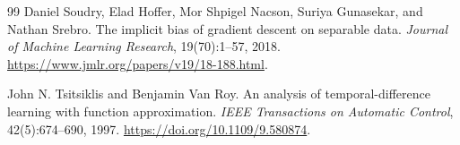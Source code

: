 \documentclass[11pt,twoside]{article}
\theoremstyle{definition}
\theoremstyle{remark}
\begin{document}
\begin{thebibliography}{99}
Daniel Soudry, Elad Hoffer, Mor Shpigel Nacson, Suriya Gunasekar, and
Nathan Srebro.
\newblock The implicit bias of gradient descent on separable data.
\newblock \emph{Journal of Machine Learning Research}, 19(70):1--57, 2018.
\newblock \url{https://www.jmlr.org/papers/v19/18-188.html}.

John N. Tsitsiklis and Benjamin Van Roy.
\newblock An analysis of temporal-difference learning with function
approximation.
\newblock \emph{IEEE Transactions on Automatic Control}, 42(5):674--690,
1997.
\newblock \url{https://doi.org/10.1109/9.580874}.

\end{thebibliography}
\end{document}
